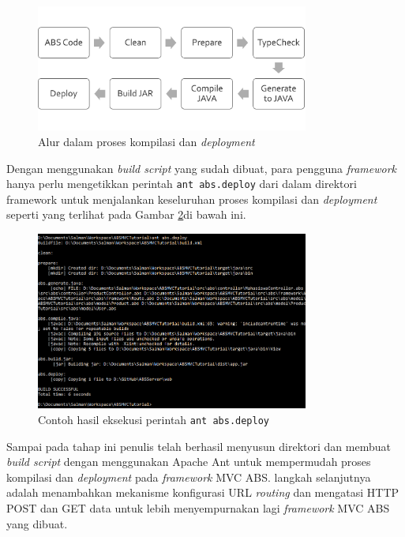 \begin{figure}
    \centering
    \includegraphics[width=0.8\textwidth]{img/build-script-flow.png}
    \caption{Alur dalam proses kompilasi dan \textit{deployment}}
    \label{fig:buildScriptFlow}
\end{figure}

Dengan menggunakan \textit{build script} yang sudah dibuat, para pengguna \textit{framework} hanya perlu mengetikkan perintah \texttt{ant abs.deploy} dari dalam direktori framework untuk menjalankan keseluruhan proses kompilasi dan \textit{deployment} seperti yang terlihat pada Gambar \ref{fig:antABSDeploy}di bawah ini.

\begin{figure}
    \centering
    \includegraphics[width=0.8\textwidth]{img/ant-abs-deploy.png}
    \caption{Contoh hasil eksekusi perintah \texttt{ant abs.deploy}}
    \label{fig:antABSDeploy}
\end{figure}

Sampai pada tahap ini penulis telah berhasil menyusun direktori dan membuat \textit{build script} dengan menggunakan Apache Ant untuk mempermudah proses kompilasi dan \textit{deployment} pada \textit{framework} MVC ABS. langkah selanjutnya adalah menambahkan mekanisme konfigurasi URL \textit{routing} dan mengatasi HTTP POST dan GET data untuk lebih menyempurnakan lagi \textit{framework} MVC ABS yang dibuat.

